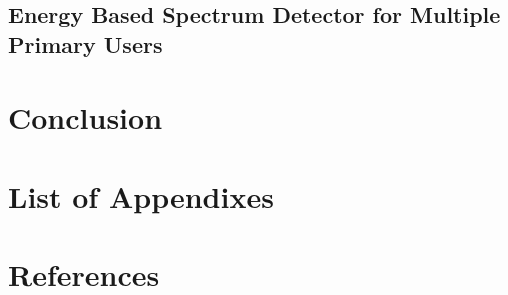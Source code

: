 \documentclass{article}
\begin{document}
\begin{spacing}{2.0}
\subsection{Energy Based Spectrum Detector for Multiple Primary Users}
\newpage
\section{ Conclusion}
\section{List of Appendixes}
\section{References}
\newpage
\end{spacing}
\end{document}
